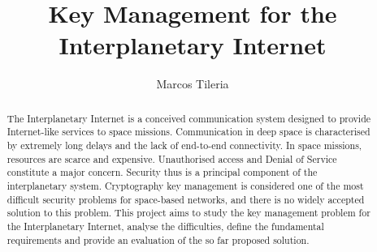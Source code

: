 \documentclass[11pt]{article} %
\title{Key Management for the Interplanetary Internet}
\author{Marcos Tileria}
\theoremstyle{plain}
\theoremstyle{definition}
\begin{document}
\maketitle


\begin{abstract}

  
The Interplanetary Internet is a conceived communication system designed to provide Internet-like services to space missions. Communication in deep space is characterised by extremely long delays and the lack of end-to-end connectivity. In space missions, resources are scarce and expensive. Unauthorised access and Denial of Service constitute a major concern. Security thus is a principal component of the interplanetary system. Cryptography key management is considered one of the most difficult security problems for space-based networks, and there is no widely accepted solution to this problem. This project aims to study the key management problem for the Interplanetary Internet, analyse the difficulties, define the fundamental requirements and provide an evaluation of the so far proposed solution.   

  
\end{abstract}




 \newpage


 \newpage


\newpage


\newpage







\end{document}

